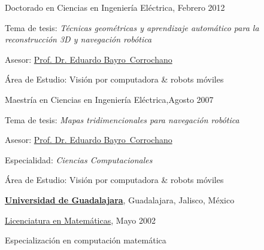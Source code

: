 \begin{outerlist}
\item[] Doctorado en Ciencias en Ingeniería Eléctrica, \hfill{Febrero 2012}
        \begin{innerlist}
        \item Tema de tesis: \emph{Técnicas geométricas y aprendizaje automático para la
              reconstrucción 3D y navegación robótica}
        \item Asesor:
              \href{https://unidad.gdl.cinvestav.mx/investigadores/investigador.php?inv=11}
                   {Prof. Dr. Eduardo Bayro~Corrochano}
        \item Área de Estudio: Visión por computadora \& robots móviles
        \end{innerlist}

\item[] Maestría en Ciencias en Ingeniería Eléctrica,\hfill{Agosto 2007}
        \begin{innerlist}
        \item Tema de tesis: \emph{Mapas tridimencionales para navegación
              robótica}
        \item Asesor:
              \href{https://unidad.gdl.cinvestav.mx/investigadores/investigador.php?inv=11}
                   {Prof. Dr. Eduardo Bayro~Corrochano}
        \item Especialidad: \emph{Ciencias Computacionales}
        \item Área de Estudio: Visión por computadora \& robots móviles
        \end{innerlist}
\end{outerlist}

\blankline

\href{http://www.udg.mx/}{\textbf{Universidad de Guadalajara}},
Guadalajara, Jalisco, México

\begin{outerlist}
\item[] \href{http://www.cucei.udg.mx/es/oferta-academica/licenciaturas/licenciatura-en-matematicas }
	{Licenciatura en Matemáticas},
\hfill{Mayo 2002}
        \begin{innerlist}
        \item Especialización en computación matemática
        \end{innerlist}
\end{outerlist}

